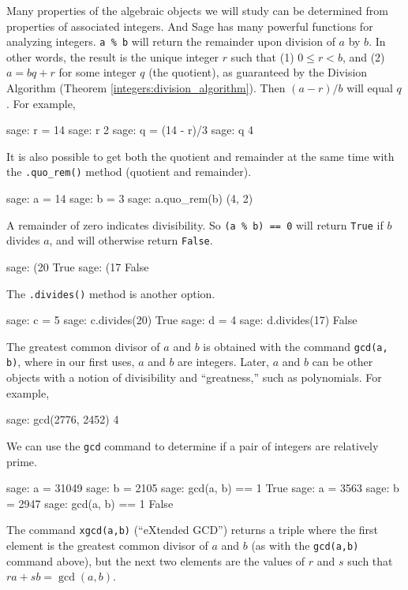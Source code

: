Many properties of the algebraic objects we will study can be determined from properties of associated integers.  And Sage has many powerful functions for analyzing integers.
%
%
%
\verb?a % b? will return the remainder upon division of $a$ by $b$.  In other words, the result is the unique integer $r$ such that (1) $0\leq r< b$, and (2) $a=bq+r$ for some integer $q$ (the quotient), as guaranteed by the Division Algorithm (Theorem \ref{integers:division_algorithm}).  Then $(a-r)/b$ will equal $q$.  For example,
%
\begin{sageexample}
sage: r = 14 %
sage: r
2
sage: q = (14 - r)/3
sage: q
4
\end{sageexample}
%
It is also possible to get both the quotient and remainder at the same time with the \verb?.quo_rem()? method (quotient and remainder).
%
\begin{sageexample}
sage: a = 14
sage: b = 3
sage: a.quo_rem(b)
(4, 2)
\end{sageexample}
%
A remainder of zero indicates divisibility.  So \verb?(a % b) == 0?
will return \verb?True? if $b$ divides $a$, and will otherwise return \verb?False?.
%
\begin{sageexample}
sage: (20 %
True
sage: (17 %
False
\end{sageexample}
%
The \verb?.divides()? method is another option.
%
\begin{sageexample}
sage: c = 5
sage: c.divides(20)
True
sage: d = 4
sage: d.divides(17)
False
\end{sageexample}
%
%
The greatest common divisor of $a$ and $b$ is obtained with the command \verb?gcd(a, b)?, where in our first uses, $a$ and $b$ are integers.  Later, $a$ and $b$ can be other objects with a notion of divisibility and ``greatness,'' such as polynomials.  For example,
%
\begin{sageexample}
sage: gcd(2776, 2452)
4
\end{sageexample}
%
We can use the \verb?gcd? command to determine if a pair of integers are relatively prime.
%
\begin{sageexample}
sage: a = 31049
sage: b = 2105
sage: gcd(a, b) == 1
True
sage: a = 3563
sage: b = 2947
sage: gcd(a, b) == 1
False
\end{sageexample}
%
The command \verb?xgcd(a,b)? (``eXtended GCD'') returns a triple where the first element is the greatest common divisor of $a$ and $b$ (as with the \verb?gcd(a,b)? command above), but the next two elements are the values of $r$ and $s$ such that $ra+sb=\gcd(a,b)$.
